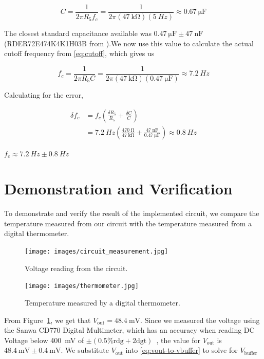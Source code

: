 \documentclass[12pt,a4paper]{article}
\begin{document}
\begin{equation*}
    C = \frac{1}{2 \pi R_5 f_c} = \frac{1}{2 \pi (\SI{47}{\kilo\ohm}) (\SI{5}{Hz})} \approx \SI{0.67}{\micro\farad} 
\end{equation*}

The closest standard capacitance available was $\SI{0.47}{\micro\farad}\pm\SI{47}{\nano\farad}$ (RDER72E474K4K1H03B from \cite{capacitor}).We now use this value to calculate the actual cutoff frequency from \eqref{eq:cutoff}, which gives us 

\begin{equation*}
    f_c = \frac{1}{2 \pi R_5 C} = \frac{1}{2 \pi (\SI{47}{\kilo\ohm}) (\SI{0.47}{\micro\farad})} \approx \SI{7.2}{Hz} 
\end{equation*}

Calculating for the error,

\begin{align*}
    \delta f_c &= f_c (\frac{\delta R_5}{R_5} + \frac{\delta C}{C}) \\
    &= \SI{7.2}{Hz} (\frac{\SI{470}{\ohm}}{\SI{47}{\kilo\ohm}} + \frac{\SI{47}{\nano\farad}}{\SI{0.47}{\micro\farad}}) \approx \SI{0.8}{Hz}
\end{align*}

$f_c\approx\SI{7.2}{Hz}\pm\SI{0.8}{Hz}$

\section{Demonstration and Verification}

To demonstrate and verify the result of the implemented circuit, we compare the temperature measured from our circuit with the temperature measured from a digital thermometer.

\begin{figure}[h]
    \centering
    \texttt{[image: images/circuit\_measurement.jpg]}
    \caption{Voltage reading from the circuit.}
    \label{fig:circuit-measure}
\end{figure}

\begin{figure}[h]
    \centering
    \texttt{[image: images/thermometer.jpg]}
    \caption{Temperature measured by a digital thermometer.}
    \label{fig:thermometer}
\end{figure}

From Figure~\ref{fig:circuit-measure}, we get that $V_{\text{out}}=\SI{48.4}{\milli\volt}$. Since we measured the voltage using the Sanwa CD770 Digital Multimeter, which has an accuracy when reading DC Voltage below \SI{400}{\milli\volt} of $\pm (0.5 \% \text{rdg} + 2 \text{dgt})$~\cite{multimeter}, the value for $V_{\text{out}}$ is $\SI{48.4}{\milli\volt} \pm \SI{0.4}{\milli\volt}$. We substitute $V_{\text{out}}$ into \eqref{eq:vout-to-vbuffer} to solve for $V_{\text{buffer}}$
\end{document}
